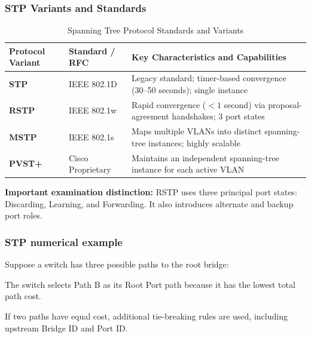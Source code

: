 \subsubsection{STP Variants and Standards}
\begin{table}[htbp]
\centering
\caption{Spanning Tree Protocol Standards and Variants}
\label{tab:stp_variants}
\begin{tabularx}{\textwidth}{p{3.0cm} p{2.8cm} X}
\toprule
\textbf{Protocol Variant} & \textbf{Standard / RFC} & \textbf{Key Characteristics and Capabilities} \\
\midrule
\textbf{STP} & IEEE 802.1D & Legacy standard; timer-based convergence (30--50 seconds); single instance \\
\textbf{RSTP} & IEEE 802.1w & Rapid convergence ($<1$ second) via proposal-agreement handshakes; 3 port states \\
\textbf{MSTP} & IEEE 802.1s & Maps multiple VLANs into distinct spanning-tree instances; highly scalable \\
\textbf{PVST+} & Cisco Proprietary & Maintains an independent spanning-tree instance for each active VLAN \\
\bottomrule
\end{tabularx}
\end{table}


\textbf{Important examination distinction:} RSTP uses three principal port states: Discarding, Learning, and Forwarding. It also introduces alternate and backup port roles.

\subsubsection{STP numerical example}

Suppose a switch has three possible paths to the root bridge:


The switch selects Path B as its Root Port path because it has the lowest total path cost.

If two paths have equal cost, additional tie-breaking rules are used, including upstream Bridge ID and Port ID.

